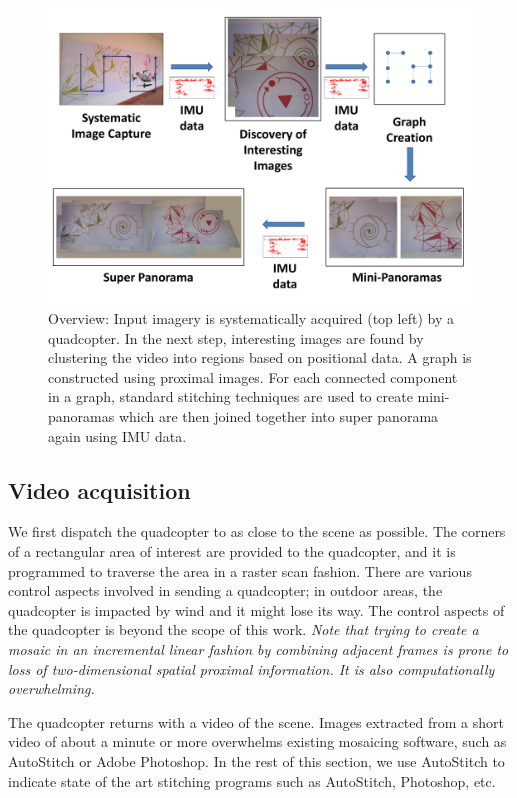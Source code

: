 \begin{figure}[h!]
  \centering
  \includegraphics[width=\textwidth]{figures/vacantSpaces/Workflow} 
  \caption[Workflow]{ \label{fig:vacantworkflow} Overview: Input imagery is
    systematically acquired (top left) by a quadcopter.  In the next
    step, interesting images are found by clustering the video into
    regions based on positional data.  A graph is constructed using
    proximal images. For each connected component in a graph, standard
    stitching techniques are used to create mini-panoramas which are
    then joined together into super panorama 
    again using IMU data.}
\end{figure}    


\subsection{Video acquisition}
We first dispatch the quadcopter to as close to the scene as
possible. The corners of a rectangular area of interest are provided
to the quadcopter, and it is programmed to traverse the area in a
raster scan fashion.  There are various control aspects involved in
sending a quadcopter; in outdoor areas, the quadcopter is impacted by
wind and it might lose its way.  The control aspects of the quadcopter
is beyond the scope of this work.  \emph{Note that trying to create a
  mosaic in an incremental linear fashion by combining adjacent frames is
  prone to loss of two-dimensional spatial proximal information. It is also
  computationally overwhelming.}

The quadcopter returns with a video of the scene.  Images extracted
from a short video of about a minute or more overwhelms existing
mosaicing software, such as AutoStitch or Adobe Photoshop.  In the
rest of this section, we use AutoStitch to indicate state of the art
stitching programs such as AutoStitch, Photoshop, etc.

